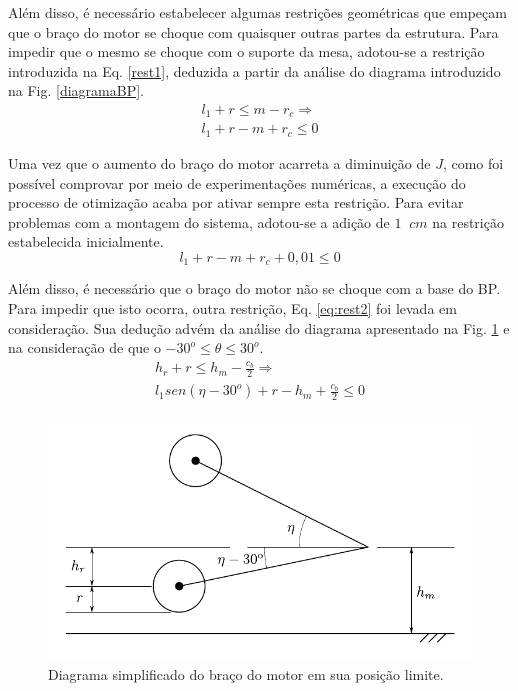 \documentclass[12pt]{article}
\begin{document}
 	Além disso, é necessário estabelecer algumas restrições geométricas que empeçam que o braço do motor se choque com quaisquer outras partes da estrutura. Para impedir que o mesmo se choque com o suporte da mesa, adotou-se a restrição introduzida na Eq. \ref{rest1}, deduzida a partir da análise do diagrama introduzido na Fig. \ref{diagramaBP}.
	\begin{equation}
		\label{rest1}
		\begin{gathered}
			l_1 + r \leq m - r_c \Rightarrow \\
			l_1 + r - m + r_c \leq 0
		\end{gathered}
	\end{equation}
	
	Uma vez que o aumento do braço do motor acarreta a diminuição de $ J $, como foi possível comprovar por meio de experimentações numéricas, a execução do processo de otimização acaba por ativar sempre esta restrição. Para evitar problemas com a montagem do sistema, adotou-se a adição de $ 1 \;\; cm $ na restrição estabelecida inicialmente. 
	\begin{equation}
		l_1 + r - m + r_c + 0,01 \leq 0
	\end{equation}
	
	Além disso, é necessário que o braço do motor não se choque com a base do BP. Para impedir que isto ocorra, outra restrição, Eq. \ref{eq:rest2} foi levada em consideração. Sua dedução advém da análise do diagrama apresentado na Fig. \ref{rest2} e na consideração de que o $ -30^o \leq \theta \leq 30^o $. 
	\begin{gather}
	\label{eq:rest2}
	h_r + r \leq h_m - \frac{c_b}{2} \nonumber \Rightarrow \\
	l_1 sen(\eta - 30^o) + r - h_m + \frac{c_b}{2} \leq 0
	\end{gather}
	
	\begin{figure}[H]
		\centering
		\includegraphics[width=0.7\linewidth]{figuras/rest2.pdf}
		\caption{Diagrama simplificado do braço do motor em sua posição limite.}
		\label{rest2}
	\end{figure}
	
\end{document}

